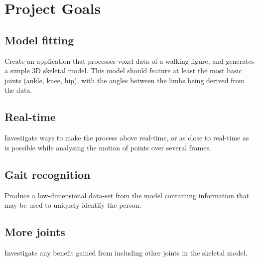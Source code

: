 \section{Project Goals}

\subsection{Model fitting}

Create an application that processes voxel data of a walking figure, and generates a simple 3D skeletal model.
This model should feature at least the most basic joints (ankle, knee, hip),
with the angles between the limbs being derived from the data.

\subsection{Real-time}

Investigate ways to make the process above real-time,
or as close to real-time as is possible while analysing the motion of points over several frames.

\subsection{Gait recognition}

Produce a low-dimensional data-set from the model containing information that may be used to uniquely identify the person.

\subsection{More joints}

Investigate any benefit gained from including other joints in the skeletal model.
